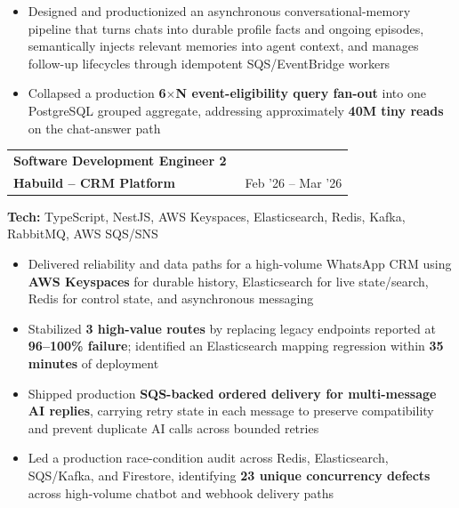 \documentclass[a4paper,11pt]{article}
\makeatletter
\newcommand{\resumeSubheading}[4]{
  \item
    \begin{tabular*}{0.97\textwidth}{l@{\extracolsep{\fill}}r}
      \textbf{#1} & #2 \\
      {#3} & {#4} \\
    \end{tabular*}
}
\makeatother
\begin{document}
\begin{itemize}
      \vspace{-2pt}
      \item{Designed and productionized an asynchronous conversational-memory pipeline that turns chats into durable profile facts and ongoing episodes, semantically injects relevant memories into agent context, and manages follow-up lifecycles through idempotent SQS/EventBridge workers}
      \vspace{-2pt}
      \item{Collapsed a production \textbf{6$\times$N event-eligibility query fan-out} into one PostgreSQL grouped aggregate, addressing approximately \textbf{40M tiny reads} on the chat-answer path}
    \end{itemize}

  \resumeSubheading
    {Software Development Engineer 2}{}
    {\textbf{Habuild -- CRM Platform}}{\faCalendar\ Feb '26 -- Mar '26}
    {\small\textbf{Tech:} TypeScript, NestJS, AWS Keyspaces, Elasticsearch, Redis, Kafka, RabbitMQ, AWS SQS/SNS\par}
    \begin{itemize}
      \item{Delivered reliability and data paths for a high-volume WhatsApp CRM using \textbf{AWS Keyspaces} for durable history, Elasticsearch for live state/search, Redis for control state, and asynchronous messaging}
      \vspace{-2pt}
      \item{Stabilized \textbf{3 high-value routes} by replacing legacy endpoints reported at \textbf{96--100\% failure}; identified an Elasticsearch mapping regression within \textbf{35 minutes} of deployment}
      \vspace{-2pt}
      \item{Shipped production \textbf{SQS-backed ordered delivery for multi-message AI replies}, carrying retry state in each message to preserve compatibility and prevent duplicate AI calls across bounded retries}
      \vspace{-2pt}
      \item{Led a production race-condition audit across Redis, Elasticsearch, SQS/Kafka, and Firestore, identifying \textbf{23 unique concurrency defects} across high-volume chatbot and webhook delivery paths}
    \end{itemize}
    \vspace{-4pt}

  \newpage
\end{document}
